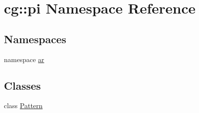 \hypertarget{namespacecg_1_1pi}{\section{cg\-:\-:pi \-Namespace \-Reference}
\label{namespacecg_1_1pi}
}
\subsection*{\-Namespaces}
\begin{DoxyCompactItemize}
\item 
namespace \hyperlink{namespacecg_1_1pi_1_1ar}{ar}
\end{DoxyCompactItemize}
\subsection*{\-Classes}
\begin{DoxyCompactItemize}
\item 
class \hyperlink{classcg_1_1pi_1_1_pattern}{\-Pattern}
\end{DoxyCompactItemize}
